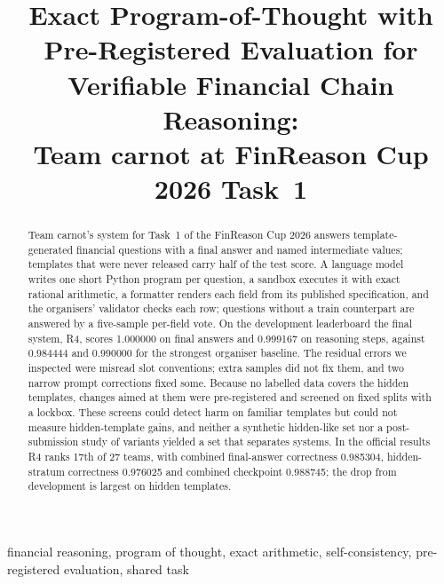 \documentclass[conference]{IEEEtran}
\begin{document}
\title{Exact Program-of-Thought with Pre-Registered Evaluation for Verifiable Financial Chain Reasoning:\\ Team carnot at FinReason Cup 2026 Task~1}

\author{
}

\maketitle

\begin{abstract}
Team carnot's system for Task~1 of the FinReason Cup 2026 answers template-generated financial questions with a final answer and named intermediate values; templates that were never released carry half of the test score. A language model writes one short Python program per question, a sandbox executes it with exact rational arithmetic, a formatter renders each field from its published specification, and the organisers' validator checks each row; questions without a train counterpart are answered by a five-sample per-field vote. On the development leaderboard the final system, R4, scores 1.000000 on final answers and 0.999167 on reasoning steps, against 0.984444 and 0.990000 for the strongest organiser baseline. The residual errors we inspected were misread slot conventions; extra samples did not fix them, and two narrow prompt corrections fixed some. Because no labelled data covers the hidden templates, changes aimed at them were pre-registered and screened on fixed splits with a lockbox. These screens could detect harm on familiar templates but could not measure hidden-template gains, and neither a synthetic hidden-like set nor a post-submission study of variants yielded a set that separates systems. In the official results R4 ranks 17th of 27 teams, with combined final-answer correctness 0.985304, hidden-stratum correctness 0.976025 and combined checkpoint 0.988745; the drop from development is largest on hidden templates.
\end{abstract}

\begin{IEEEkeywords}
financial reasoning, program of thought, exact arithmetic, self-consistency, pre-registered evaluation, shared task
\end{IEEEkeywords}
\end{document}
